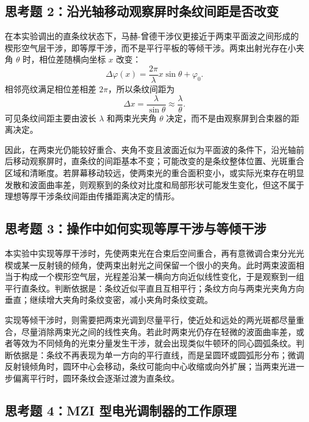 \documentclass[12pt, a4paper]{article}
\begin{document}
\subsection*{思考题 2：沿光轴移动观察屏时条纹间距是否改变}

在本实验调出的直条纹状态下，马赫-曾德干涉仪更接近于两束平面波之间形成的楔形空气层干涉，即等厚干涉，而不是平行平板的等倾干涉。两束出射光存在小夹角 $\theta$ 时，相位差随横向坐标 $x$ 改变：
\begin{equation}
  \Delta\varphi(x) = \frac{2\pi}{\lambda}x\sin\theta + \varphi_0 .
\end{equation}
相邻亮纹满足相位差相差 $2\pi$，所以条纹间距为
\begin{equation}
  \Delta x = \frac{\lambda}{\sin\theta} \approx \frac{\lambda}{\theta}.
\end{equation}
可见条纹间距主要由波长 $\lambda$ 和两束光夹角 $\theta$ 决定，而不是由观察屏到合束器的距离决定。

因此，在两束光仍能较好重合、夹角不变且波面近似为平面波的条件下，沿光轴前后移动观察屏时，直条纹的间距基本不变；可能改变的是条纹整体位置、光斑重合区域和清晰度。若屏幕移动较远，使两束光的重合面积变小，或实际光束存在明显发散和波面曲率差，则观察到的条纹对比度和局部形状可能发生变化，但这不属于理想等厚干涉条纹间距由传播距离决定的情形。

\subsection*{思考题 3：操作中如何实现等厚干涉与等倾干涉}

本实验中实现等厚干涉时，先使两束光在合束后空间重合，再有意微调合束分光光楔或某一反射镜的倾角，使两束出射光之间保留一个很小的夹角。此时两束波面相当于构成一个楔形空气层，光程差沿某一横向方向近似线性变化，于是观察到一组平行直条纹。判断依据是：条纹近似平直且互相平行；条纹方向与两束光夹角方向垂直；继续增大夹角时条纹变密，减小夹角时条纹变疏。

实现等倾干涉时，则需要把两束光调到尽量平行，使近处和远处的两光斑都尽量重合，尽量消除两束光之间的线性夹角。若此时两束光仍存在轻微的波面曲率差，或者等效为不同倾角的光束分量发生干涉，就会出现类似牛顿环的同心圆弧条纹。判断依据是：条纹不再表现为单一方向的平行直线，而是呈圆环或圆弧形分布；微调反射镜倾角时，圆环中心会移动，条纹可能向中心收缩或向外扩展；当两束光进一步偏离平行时，圆环条纹会逐渐过渡为直条纹。

\subsection*{思考题 4：MZI 型电光调制器的工作原理}
\end{document}
